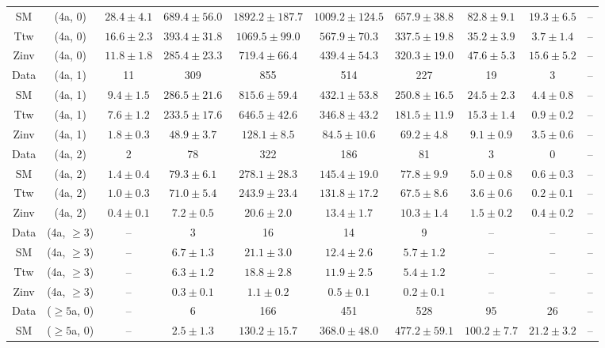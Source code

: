 \begin{table}[h!]
{\begin{tabular}{cccccccccc}
	SM & (4a, 0) & $28.4\pm 4.1$ & $689.4\pm 56.0$ & $1892.2\pm 187.7$ & $1009.2\pm 124.5$ & $657.9\pm 38.8$ & $82.8\pm 9.1$ & $19.3\pm 6.5$ & -- \\[0.5ex] 
	Ttw & (4a, 0) & $16.6\pm 2.3$ & $393.4\pm 31.8$ & $1069.5\pm 99.0$ & $567.9\pm 70.3$ & $337.5\pm 19.8$ & $35.2\pm 3.9$ & $3.7\pm 1.4$ & -- \\[0.5ex] 
	Zinv & (4a, 0) & $11.8\pm 1.8$ & $285.4\pm 23.3$ & $719.4\pm 66.4$ & $439.4\pm 54.3$ & $320.3\pm 19.0$ & $47.6\pm 5.3$ & $15.6\pm 5.2$ & -- \\[0.5ex] 
	Data & (4a, 1) & 11 & 309 & 855 & 514 & 227 & 19 & 3 & -- \\[0.5ex] 
	SM & (4a, 1) & $9.4\pm 1.5$ & $286.5\pm 21.6$ & $815.6\pm 59.4$ & $432.1\pm 53.8$ & $250.8\pm 16.5$ & $24.5\pm 2.3$ & $4.4\pm 0.8$ & -- \\[0.5ex] 
	Ttw & (4a, 1) & $7.6\pm 1.2$ & $233.5\pm 17.6$ & $646.5\pm 42.6$ & $346.8\pm 43.2$ & $181.5\pm 11.9$ & $15.3\pm 1.4$ & $0.9\pm 0.2$ & -- \\[0.5ex] 
	Zinv & (4a, 1) & $1.8\pm 0.3$ & $48.9\pm 3.7$ & $128.1\pm 8.5$ & $84.5\pm 10.6$ & $69.2\pm 4.8$ & $9.1\pm 0.9$ & $3.5\pm 0.6$ & -- \\[0.5ex] 
	Data & (4a, 2) & 2 & 78 & 322 & 186 & 81 & 3 & 0 & -- \\[0.5ex] 
	SM & (4a, 2) & $1.4\pm 0.4$ & $79.3\pm 6.1$ & $278.1\pm 28.3$ & $145.4\pm 19.0$ & $77.8\pm 9.9$ & $5.0\pm 0.8$ & $0.6\pm 0.3$ & -- \\[0.5ex] 
	Ttw & (4a, 2) & $1.0\pm 0.3$ & $71.0\pm 5.4$ & $243.9\pm 23.4$ & $131.8\pm 17.2$ & $67.5\pm 8.6$ & $3.6\pm 0.6$ & $0.2\pm 0.1$ & -- \\[0.5ex] 
	Zinv & (4a, 2) & $0.4\pm 0.1$ & $7.2\pm 0.5$ & $20.6\pm 2.0$ & $13.4\pm 1.7$ & $10.3\pm 1.4$ & $1.5\pm 0.2$ & $0.4\pm 0.2$ & -- \\[0.5ex] 
	Data & (4a, $\ge3$) & -- & 3 & 16 & 14 & 9 & -- & -- & -- \\[0.5ex] 
	SM & (4a, $\ge3$) & -- & $6.7\pm 1.3$ & $21.1\pm 3.0$ & $12.4\pm 2.6$ & $5.7\pm 1.2$ & -- & -- & -- \\[0.5ex] 
	Ttw & (4a, $\ge3$) & -- & $6.3\pm 1.2$ & $18.8\pm 2.8$ & $11.9\pm 2.5$ & $5.4\pm 1.2$ & -- & -- & -- \\[0.5ex] 
	Zinv & (4a, $\ge3$) & -- & $0.3\pm 0.1$ & $1.1\pm 0.2$ & $0.5\pm 0.1$ & $0.2\pm 0.1$ & -- & -- & -- \\[0.5ex] 
	Data & ($\ge5$a, 0) & -- & 6 & 166 & 451 & 528 & 95 & 26 & -- \\[0.5ex] 
	SM & ($\ge5$a, 0) & -- & $2.5\pm 1.3$ & $130.2\pm 15.7$ & $368.0\pm 48.0$ & $477.2\pm 59.1$ & $100.2\pm 7.7$ & $21.2\pm 3.2$ & -- \\[0.5ex] 

\end{tabular}}
\end{table}

